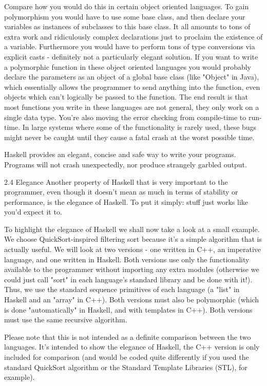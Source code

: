 \documentclass{report}
\begin{document}
Compare how you would do this in certain object oriented languages. To gain polymorphism you would have to use some base class, and then declare your variables as instances of subclasses to this base class. It all amounts to tons of extra work and ridiculously complex declarations just to proclaim the existence of a variable. Furthermore you would have to perform tons of type conversions via explicit casts - definitely not a particularly elegant solution. If you want to write a polymorphic function in these object oriented languages you would probably declare the parameters as an object of a global base class (like "Object" in Java), which essentially allows the programmer to send anything into the function, even objects which can't logically be passed to the function. The end result is that most functions you write in these languages are not general, they only work on a single data type. You're also moving the error checking from compile-time to run-time. In large systems where some of the functionality is rarely used, these bugs might never be caught until they cause a fatal crash at the worst possible time.

Haskell provides an elegant, concise and safe way to write your programs. Programs will not crash unexpectedly, nor produce strangely garbled output.

2.4 Elegance
Another property of Haskell that is very important to the programmer, even though it doesn't mean as much in terms of stability or performance, is the elegance of Haskell. To put it simply: stuff just works like you'd expect it to.

To highlight the elegance of Haskell we shall now take a look at a small example. We choose QuickSort-inspired filtering sort because it's a simple algorithm that is actually useful. We will look at two versions - one written in C++, an imperative language, and one written in Haskell. Both versions use only the functionality available to the programmer without importing any extra modules (otherwise we could just call "sort" in each language's standard library and be done with it!). Thus, we use the standard sequence primitives of each language (a "list" in Haskell and an "array" in C++). Both versions must also be polymorphic (which is done "automatically" in Haskell, and with templates in C++). Both versions must use the same recursive algorithm.

Please note that this is not intended as a definite comparison between the two languages. It's intended to show the elegance of Haskell, the C++ version is only included for comparison (and would be coded quite differently if you used the standard QuickSort algorithm or the Standard Template Libraries (STL), for example).
\end{document}
